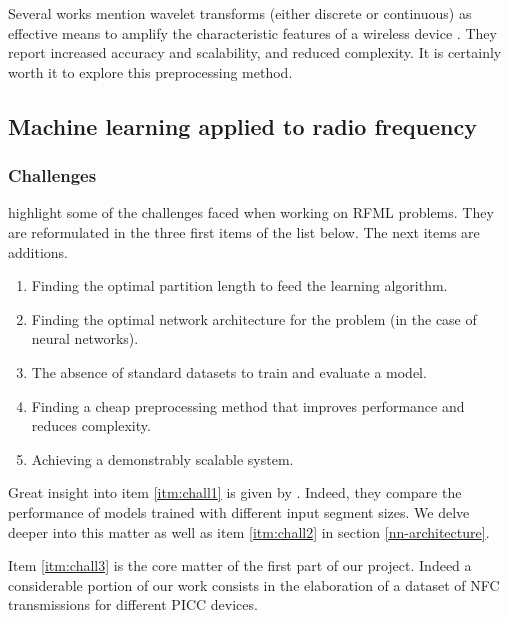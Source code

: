 Several works mention wavelet transforms (either discrete or continuous) as effective means to amplify the characteristic features of a wireless device \cite{xu_device_2015, oyedare_estimating_2019, youssef_machine_2017}. They report increased accuracy and scalability, and reduced complexity. It is certainly worth it to explore this preprocessing method.

\subsection{Machine learning applied to radio frequency}

\subsubsection{Challenges} \label{challenges}

\textcite{riyaz_deep_2018} highlight some of the challenges faced when working on RFML problems. They are reformulated in the three first items of the list below. The next items are additions.

\begin{enumerate}
  \item \label{itm:chall1} Finding the optimal partition length to feed the learning algorithm.
  \item \label{itm:chall2} Finding the optimal network architecture for the problem (in the case of neural networks).
  \item \label{itm:chall3} The absence of standard datasets to train and evaluate a model.
  \item Finding a cheap preprocessing method that improves performance and reduces complexity.
  \item Achieving a demonstrably scalable system.
\end{enumerate}

Great insight into item \ref{itm:chall1} is given by \textcite{youssef_machine_2017}. Indeed, they compare the performance of models trained with different input segment sizes. We delve deeper into this matter as well as item \ref{itm:chall2} in section \ref{nn-architecture}.

Item \ref{itm:chall3} is the core matter of the first part of our project. Indeed a considerable portion of our work consists in the elaboration of a dataset of NFC transmissions for different PICC devices.

